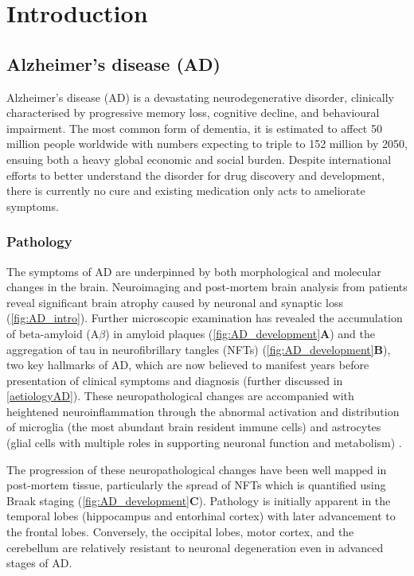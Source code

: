 \chapter{Introduction}

\section{Alzheimer's disease (AD)}

Alzheimer’s disease (AD) is a devastating neurodegenerative disorder, clinically characterised by progressive memory loss, cognitive decline, and behavioural impairment. The most common form of dementia, it is estimated to affect 50 million people worldwide with numbers expecting to triple to 152 million by 2050, ensuing both a heavy global economic and social burden\cite{International2020}. Despite international efforts to better understand the disorder for drug discovery and development, there is currently no cure and existing medication only acts to ameliorate symptoms.

\subsection{Pathology}
\label{ch1: ad_pathology}
The symptoms of AD are underpinned by both morphological and molecular changes in the brain. Neuroimaging and post-mortem brain analysis from patients reveal significant brain atrophy caused by neuronal and synaptic loss\cite{Selkoe1991,Perl2010} (\cref{fig:AD_intro}). Further microscopic examination has revealed the accumulation of beta-amyloid (A$\beta$) in amyloid plaques (\cref{fig:AD_development}\textbf{A}) and the aggregation of tau in neurofibrillary tangles (NFTs) (\cref{fig:AD_development}\textbf{B}), two key hallmarks of AD, which are now believed to manifest years before presentation of clinical symptoms and diagnosis \cite{Sperling2011} (further discussed in \cref{aetiologyAD}). These neuropathological changes are accompanied with heightened neuroinflammation through the abnormal activation and distribution of microglia (the most abundant brain resident immune cells) and astrocytes (glial cells with multiple roles in supporting neuronal function and metabolism) \cite{Heneka2015}. 

The progression of these neuropathological changes have been well mapped in post-mortem tissue, particularly the spread of NFTs which is quantified using Braak staging\cite{H1991} (\cref{fig:AD_development}\textbf{C}). Pathology is initially apparent in the temporal lobes (hippocampus and entorhinal cortex) with later advancement to the frontal lobes. Conversely, the occipital lobes, motor cortex, and the cerebellum are relatively resistant to neuronal degeneration even in advanced stages of AD\cite{Xu2019}.

